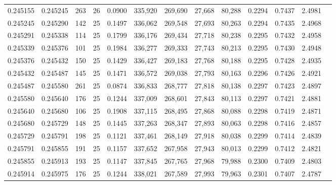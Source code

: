 \begin{tabular}{rrrrrrrrrrrrr}
0.245155 & 0.245245 &   263 &  26 &                                     0.0900 & 335,920 & 269,690 &  27,668 &  80,288 & 0.2294 & 0.7437 & 2.4981 \\
0.245245 & 0.245290 &   142 &  25 &                                     0.1497 & 336,062 & 269,548 &  27,693 &  80,263 & 0.2294 & 0.7435 & 2.4968 \\
0.245291 & 0.245338 &   114 &  25 &                                     0.1799 & 336,176 & 269,434 &  27,718 &  80,238 & 0.2295 & 0.7432 & 2.4958 \\
0.245339 & 0.245376 &   101 &  25 &                                     0.1984 & 336,277 & 269,333 &  27,743 &  80,213 & 0.2295 & 0.7430 & 2.4948 \\
0.245376 & 0.245432 &   150 &  25 &                                     0.1429 & 336,427 & 269,183 &  27,768 &  80,188 & 0.2295 & 0.7428 & 2.4935 \\
0.245432 & 0.245487 &   145 &  25 &                                     0.1471 & 336,572 & 269,038 &  27,793 &  80,163 & 0.2296 & 0.7426 & 2.4921 \\
0.245487 & 0.245580 &   261 &  25 &                                     0.0874 & 336,833 & 268,777 &  27,818 &  80,138 & 0.2297 & 0.7423 & 2.4897 \\
0.245580 & 0.245640 &   176 &  25 &                                     0.1244 & 337,009 & 268,601 &  27,843 &  80,113 & 0.2297 & 0.7421 & 2.4881 \\
0.245640 & 0.245680 &   106 &  25 &                                     0.1908 & 337,115 & 268,495 &  27,868 &  80,088 & 0.2298 & 0.7419 & 2.4871 \\
0.245680 & 0.245729 &   148 &  25 &                                     0.1445 & 337,263 & 268,347 &  27,893 &  80,063 & 0.2298 & 0.7416 & 2.4857 \\
0.245729 & 0.245791 &   198 &  25 &                                     0.1121 & 337,461 & 268,149 &  27,918 &  80,038 & 0.2299 & 0.7414 & 2.4839 \\
0.245791 & 0.245855 &   191 &  25 &                                     0.1157 & 337,652 & 267,958 &  27,943 &  80,013 & 0.2299 & 0.7412 & 2.4821 \\
0.245855 & 0.245913 &   193 &  25 &                                     0.1147 & 337,845 & 267,765 &  27,968 &  79,988 & 0.2300 & 0.7409 & 2.4803 \\
0.245914 & 0.245975 &   176 &  25 &                                     0.1244 & 338,021 & 267,589 &  27,993 &  79,963 & 0.2301 & 0.7407 & 2.4787 \\

\end{tabular}
